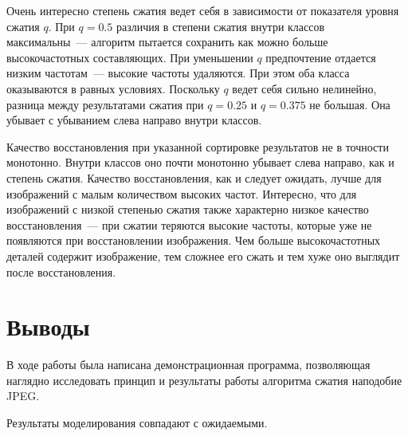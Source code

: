 \documentclass[12pt,a4paper]{article}
\begin{document}
            Очень интересно степень сжатия ведет себя в зависимости от показателя уровня сжатия $q$. При $q = 0.5$ различия в степени сжатия внутри классов максимальны~--- алгоритм пытается сохранить как можно больше высокочастотных составляющих. При уменьшении $q$ предпочтение отдается низким частотам~--- высокие частоты удаляются. При этом оба класса оказываются в равных условиях. Поскольку $q$ ведет себя сильно нелинейно, разница между результатами сжатия при $q = 0.25$ и $q = 0.375$ не большая. Она убывает с убыванием слева направо внутри классов.

            Качество восстановления при указанной сортировке результатов не в точности монотонно. Внутри классов оно почти монотонно убывает слева направо, как и степень сжатия. Качество восстановления, как и следует ожидать, лучше для изображений с малым количеством высоких частот. Интересно, что для изображений с низкой степенью сжатия также характерно низкое качество восстановления~--- при сжатии теряются высокие частоты, которые уже не появляются при восстановлении изображения. Чем больше высокочастотных деталей содержит изображение, тем сложнее его сжать и тем хуже оно выглядит после восстановления.


    \section{Выводы}

        В ходе работы была написана демонстрационная программа, позволяющая наглядно исследовать принцип и результаты работы алгоритма сжатия наподобие JPEG.

        Результаты моделирования совпадают с ожидаемыми.

    \clearpage


    \nocite{*}
    
    
\end{document}
